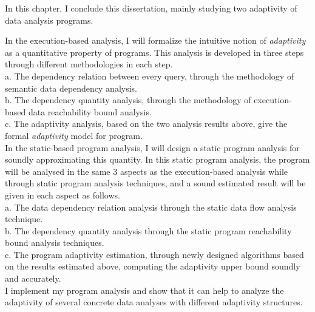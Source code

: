 In this chapter, I conclude this dissertation, mainly studying two adaptivity of data analysis programs.

In the execution-based analysis, I will formalize the intuitive notion of \emph{adaptivity} as a quantitative 
   property of programs. This analysis is developed in three steps through different methodologies in each step. 
   \\
	a. The dependency relation between every query, through the methodology of semantic data dependency analysis.
   \\
	b. The dependency quantity analysis, through the methodology of execution-based data reachability bound analysis.
   \\
	c. The adaptivity analysis, based on the two analysis results above, give the formal \emph{adaptivity} model 
   for program.
   \\   
	In the static-based program analysis, I will design a static program analysis for soundly approximating this quantity.
   In this static program analysis, the program will be analysed in the same 3 aspects as the execution-based analysis 
   while through static program analysis techniques, and a sound estimated result will be given in each aspect as follows.
   \\
	a. The data dependency relation analysis through the static data flow analysis technique.
   \\
	b. The dependency quantity analysis through the static program reachability bound analysis techniques.
   \\
	c. The program adaptivity estimation, through newly designed algorithms based on the results estimated above, 
   computing the adaptivity upper bound soundly 
   and accurately.
   \\
I implement my program analysis and show that it can help to analyze the adaptivity of several concrete data analyses with different adaptivity structures.

